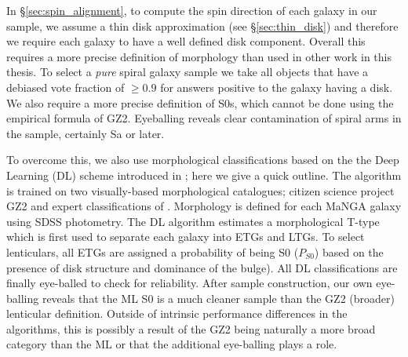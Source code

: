 In \S\ref{sec:spin_alignment}, to compute the spin direction of each galaxy in our sample, we assume a thin disk approximation (see \S\ref{sec:thin_disk}) and therefore we require each galaxy to have a well defined disk component. Overall this requires a more precise definition of morphology than used in other work in this thesis. To select a \textit{pure} spiral galaxy sample we take all objects that have a debiased vote fraction of $\geq 0.9$ for answers positive to the galaxy having a disk. We also require a more precise definition of S0s, which cannot be done using the empirical formula of GZ2. Eyeballing reveals clear contamination of spiral arms in the sample, certainly Sa or later. 

To overcome this, we also use morphological classifications based on the the Deep Learning (DL) scheme introduced in \citet{Dominguez2018}; here we give a quick outline. The algorithm is trained on two visually-based morphological catalogues; citizen science project GZ2 and expert classifications of \citet{nair2010}. Morphology is defined for each MaNGA galaxy using SDSS photometry. The DL algorithm estimates a morphological T-type \citep[e.g. see;][for more information]{nair2010} which is first used to separate each galaxy into ETGs and LTGs. To select lenticulars, all ETGs are assigned a probability of being S0 ($P_{S0}$) based on the presence of disk structure and dominance of the bulge). All DL classifications are finally eye-balled to check for reliability. After sample construction, our own eye-balling reveals that the ML S0 is a much cleaner sample than the GZ2 (broader) lenticular definition. Outside of intrinsic performance differences in the algorithms, this is possibly a result of the GZ2 being naturally a more broad category than the ML or that the additional eye-balling plays a role.

